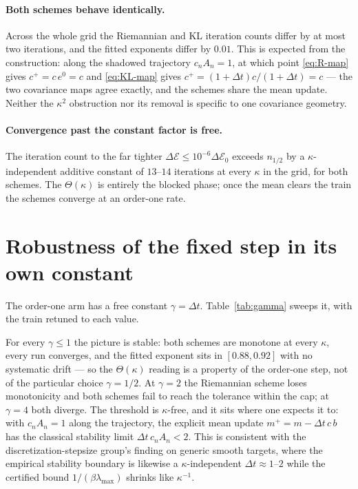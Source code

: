 \documentclass[11pt]{article}
\newcommand{\calE}{\mathcal{E}}
\newcommand{\DeltaE}{\Delta\calE}
\begin{document}
\paragraph{Both schemes behave identically.}
Across the whole grid the Riemannian and KL iteration counts differ by at most two
iterations, and the fitted exponents differ by $0.01$. This is expected from the
construction: along the shadowed trajectory $c_nA_n=1$, at which point
\eqref{eq:R-map} gives $c^+=c\,e^{0}=c$ and \eqref{eq:KL-map} gives
$c^+=(1+\Delta t)c/(1+\Delta t)=c$ --- the two covariance maps agree exactly, and the
schemes share the mean update. Neither the $\kappa^2$ obstruction nor its removal is
specific to one covariance geometry.

\paragraph{Convergence past the constant factor is free.}
The iteration count to the far tighter $\DeltaE\le10^{-6}\DeltaE_0$ exceeds
$n_{1/2}$ by a $\kappa$-independent additive constant of $13$--$14$ iterations at
every $\kappa$ in the grid, for both schemes. The $\Theta(\kappa)$ is entirely the
blocked phase; once the mean clears the train the schemes converge at an order-one
rate.

\section{Robustness of the fixed step in its own constant}
\label{sec:gamma}

The order-one arm has a free constant $\gamma=\Delta t$. Table~\ref{tab:gamma}
sweeps it, with the train retuned to each value.

\begin{table}[t]
\centering

\caption{The fixed, $\kappa$-independent step swept over its own constant, on the
retuned train, $\kappa\in\{32,\dots,1024\}$. ``Monotone / converged'' requires every
run in the $\kappa$ grid to be monotone in the objective and to reach
$10^{-6}\DeltaE_0$ within the iteration cap.}
\label{tab:gamma}
\end{table}

For every $\gamma\le1$ the picture is stable: both schemes are monotone at every
$\kappa$, every run converges, and the fitted exponent sits in $[0.88,0.92]$ with no
systematic drift --- so the $\Theta(\kappa)$ reading is a property of the order-one
step, not of the particular choice $\gamma=1/2$. At $\gamma=2$ the Riemannian scheme
loses monotonicity and both schemes fail to reach the tolerance within the cap; at
$\gamma=4$ both diverge. The threshold is $\kappa$-free, and it sits where one
expects it to: with $c_nA_n=1$ along the trajectory, the explicit mean update
$m^+=m-\Delta t\,c\,b$ has the classical stability limit $\Delta t\,c_nA_n<2$. This is
consistent with the discretization-stepsize group's finding on generic smooth
targets, where the empirical stability boundary is likewise a $\kappa$-independent
$\Delta t\approx1$--$2$ while the certified bound $1/(\beta\lambda_{\max})$ shrinks
like $\kappa^{-1}$.
\end{document}
